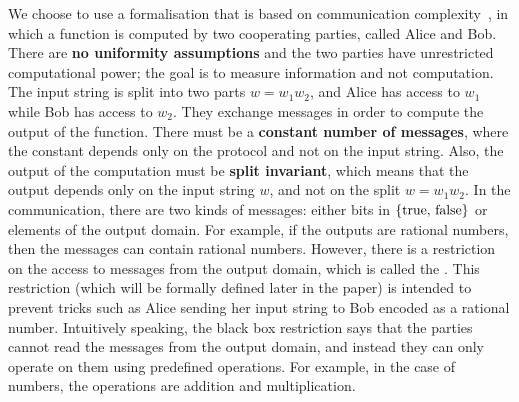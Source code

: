 \AP
We choose to use a formalisation that is based on communication complexity~\cite{YAO79,KUSH97}, in which a function is computed by two cooperating parties, called Alice and Bob. 
There are \textbf{no uniformity assumptions} and the two parties
have unrestricted computational power; the goal is to measure information 
and
not computation.  The input string is split into two parts $w = w_1 w_2$, and
Alice has access to $w_1$ while Bob has access to $w_2$. They exchange messages
in order to compute the output of the function. There must be a
\textbf{constant number of messages}, where the constant  depends only on the
protocol and not on the input string. Also, the  output of the computation must
be \textbf{split invariant}, which means that the output depends only on the
input string $w$, and not on the split $w = w_1 w_2$. In the communication,
there are two kinds of messages:  either bits in $\{\text{true, false}\}$  or
elements of the output domain.
For example, if the outputs are rational
numbers, then the messages can contain rational numbers. However, there is a
restriction on the access to messages from the output domain, which is called
the \emph{\textbf{}}. This restriction (which will be formally
defined later in the paper) is intended to prevent tricks such as Alice sending
her input string to Bob encoded as a rational number. Intuitively speaking,
the  black box restriction says that the parties cannot read the messages from
the output domain, and instead they can only operate on them using predefined
operations. For example, in the case of numbers, the operations are addition
and multiplication.

